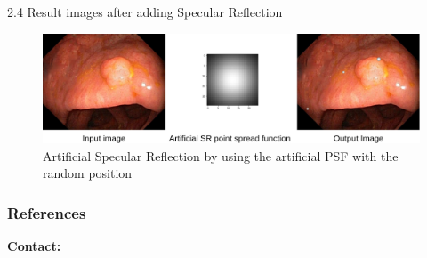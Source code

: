 \documentclass{libs/ufc_format}
\begin{document}
\begin{frame}{2.4 Result images after adding Specular Reflection}






    \begin{figure}
        \centering
        \includegraphics[width=1\textwidth]{libs/srres4.png}
        \caption{Artificial Specular Reflection by using the artificial PSF with the random position}
        \label{sr_inpainted}
    \end{figure}
\end{frame}

\begin{frame}[shrink=50]
    \frametitle{References}
    \printbibliography
\end{frame}

\begin{frame}{}
    \centering
    \huge{\textbf{}}

    \vspace{1cm}

    \Large{\textbf{Contact:}}
    \newline
    \vspace*{0.5cm}
    \large{}
\end{frame}
\end{document}
